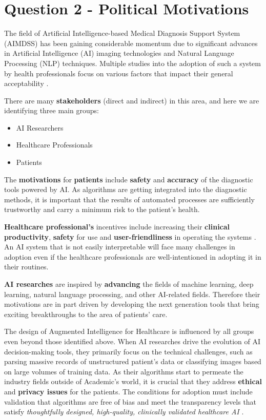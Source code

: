 \documentclass[12pt,letterpaper]{article}
\begin{document}
\section*{Question 2 - Political Motivations}

The field of Artificial Intelligence-based Medical Diagnosis Support System (AIMDSS) has been gaining considerable momentum due to significant advances in Artificial Intelligence (AI) imaging technologies and Natural Language Processing (NLP) techniques. Multiple studies into the adoption of such a system by health professionals focus on various factors that impact their general acceptability \cite{fan2018investigating}.

There are many \textbf{stakeholders} (direct and indirect) in this area, and here we are identifying three main groups:

\begin{itemize}
    \item AI Researchers
    \item Healthcare Professionals
    \item Patients 
\end{itemize}

The \textbf{motivations} for \textbf{patients} include \textbf{safety} and \textbf{accuracy} of the diagnostic tools powered by AI. As algorithms are getting integrated into the diagnostic methods, it is important that the results of automated processes are sufficiently trustworthy and carry a minimum risk to the patient's health. 

\textbf{Healthcare professional's} incentives include increasing their \textbf{clinical productivity}, \textbf{safety} for use and \textbf{user-friendliness} in operating the systems \cite{ishak2002artificial}. An AI system that is not easily interpretable will face many challenges in adoption even if the healthcare professionals are well-intentioned in adopting it in their routines. 

\textbf{AI researches} are inspired by \textbf{advancing} the fields of machine learning, deep learning, natural language processing, and other AI-related fields. Therefore their motivations are in part driven by developing the next generation tools that bring exciting breakthroughs to the area of patients' care.

The design of Augmented Intelligence for Healthcare is influenced by all groups even beyond those identified above. When AI researches drive the evolution of AI decision-making tools, they primarily focus on the technical challenges, such as parsing massive records of unstructured patient's data or classifying images based on large volumes of training data. As their algorithms start to permeate the industry fields outside of Academic's world, it is crucial that they address \textbf{ethical} and \textbf{privacy issues} for the patients. The conditions for adoption must include validation that algorithms are free of bias and meet the transparency levels that satisfy \textit{thoughtfully designed, high-quality, clinically validated healthcare AI} \cite{blog:healthitanalytics}.
\end{document}
